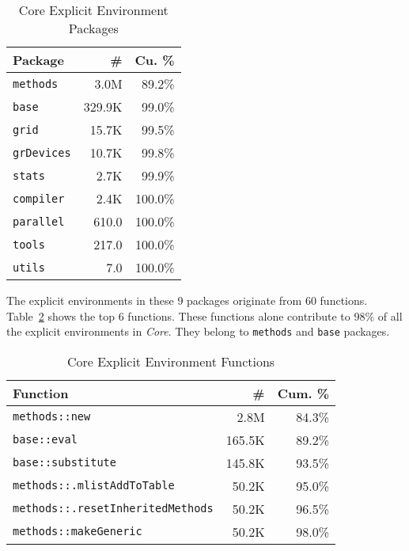 \documentclass[10pt,review,sigplan,anonymous=true,authorversion=true,nonacm=true]{acmart}
\newcommand{\code}[1]{\lstinline |#1|\xspace}
\begin{document}
\begin{table}[!h]
  \vspace{-3mm}
  \small
  \caption{Core Explicit Environment Packages} \label{table:core_explicit_pack}
  \centering
  \begin{tabular}{lrr}
    \toprule
    \textbf{Package}&\textbf{\#}&\textbf{Cu. \%}\\
    \midrule
    \code{methods}&3.0M&89.2\%\\
    \code{base}&329.9K&99.0\%\\
    \code{grid}&15.7K&99.5\%\\
    \code{grDevices}&10.7K&99.8\%\\
    \code{stats}&2.7K&99.9\%\\
    \code{compiler}&2.4K&100.0\%\\
    \code{parallel}&610.0&100.0\%\\
    \code{tools}&217.0&100.0\%\\
    \code{utils}&7.0&100.0\%\\
    \bottomrule
  \end{tabular}
\end{table}

The explicit environments in these 9 packages originate from 60 functions.
Table~\ref{table:core_explicit_fun} shows the top 6 functions. These functions
alone contribute to 98\% of all the explicit environments in \emph{Core}. They
belong to \code{methods} and \code{base} packages.

\begin{table}[!h]
  \vspace{-3mm}
  \small
  \caption{Core Explicit Environment Functions} \label{table:core_explicit_fun}
  \centering
  \begin{tabular}{lrr}
    \toprule
    \textbf{Function}&\textbf{\#}&\textbf{Cum. \%}\\
    \midrule
    \code{methods::new}&2.8M&84.3\%\\
    \code{base::eval}&165.5K&89.2\%\\
    \code{base::substitute}&145.8K&93.5\%\\
    \code{methods::.mlistAddToTable}&50.2K&95.0\%\\
    \code{methods::.resetInheritedMethods}&50.2K&96.5\%\\
    \code{methods::makeGeneric}&50.2K&98.0\%\\
    \bottomrule
  \end{tabular}
\end{table}
\end{document}
